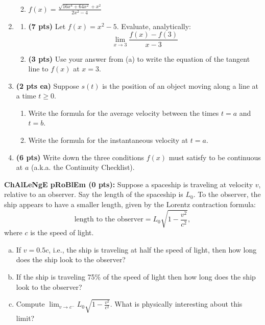 \documentclass[12pt,letterpaper]{article}
\begin{document}
\begin{enumerate}
\begin{enumerate}
\newpage
\item $f(x)=\displaystyle\frac{\sqrt{16x^4+64x^2}+x^2}{2x^2-4}$
\end{enumerate}

\newpage
\item \begin{enumerate}
	\item {\bf (7 pts)} Let $f(x)=x^2-5$.  Evaluate, analytically:
	\[\displaystyle\lim_{x\to 3}\frac{f(x)-f(3)}{x-3}\]

	\vspace{23pc}
	\item {\bf (3 pts)} Use your answer from (a) to write the equation of the tangent line to $f(x)$ at $x=3$.
	\end{enumerate}

\newpage
\item {\bf (2 pts ea)} Suppose $s(t)$ is the position of an object moving along a line at a time $t\geq 0$.  

\vspace{1pc}
\begin{enumerate}
\item Write the formula for the average velocity between the times $t=a$ and $t=b$.

\vspace{10pc} 
\item Write the formula for the instantaneous velocity at $t=a$.  
\end{enumerate}

\vspace{10pc}
\item {\bf (6 pts)} Write down the three conditions $f(x)$ must satisfy to be continuous at $a$ (a.k.a. the Continuity Checklist).
\end{enumerate}

\newpage
{\bf ChAlLeNgE pRoBlEm (0 pts):} Suppose a spaceship is traveling at velocity $v$, relative to an observer.  Say the length of the spaceship is $L_0$.  To the observer, the ship appears to have a smaller length, given by the Lorentz contraction formula:
\[\text{length to the observer}=L_0\sqrt{1-\frac{v^2}{c^2}},\]
where $c$ is the speed of light.
\begin{enumerate}[(a)]
\item If $v=0.5c$, i.e., the ship is traveling at half the speed of light, then how long does the ship look to the observer?

\vspace{12pc}
\item If the ship is traveling 75\% of the speed of light then how long does the ship look to the observer?

\vspace{12pc}
\item Compute $\displaystyle\lim_{v\to c^-}L_0\sqrt{1-\frac{v^2}{c^2}}$.  What is physically interesting about this limit?
\end{enumerate}
\end{document}

